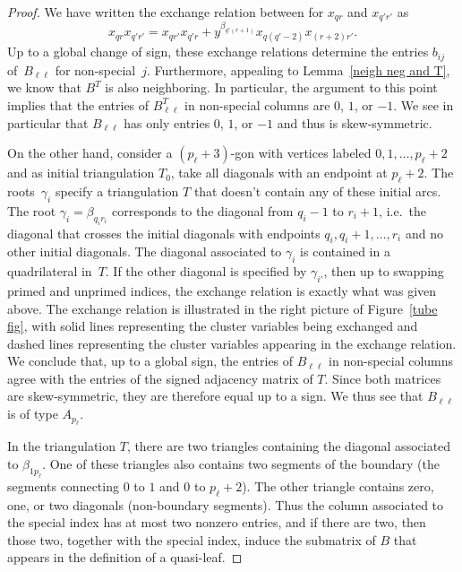 \documentclass{amsart}
\theoremstyle{definition}
\theoremstyle{remark}
\numberwithin{equation}{section}
\newcommand{\0}{{\mathbf{0}}}
\begin{document}
\begin{proof}
We have written the exchange relation between for $x_{qr}$ and $x_{q'r'}$ as 
\begin{equation}\label{exch rel eq}
x_{qr}x_{q'r'}=x_{qr'}x_{q'r}+y^{\beta_{q'(r+1)}}x_{q(q'-2)}x_{(r+2)r'}.
\end{equation}
Up to a global change of sign, these exchange relations determine the entries $b_{ij}$ of~$B_{\ell\ell}$ for non-special~$j$.
Furthermore, appealing to Lemma~\ref{neigh neg and T}, we know that $B^T$ is also neighboring.
In particular, the argument to this point implies that the entries of $B_{\ell\ell}^T$ in non-special columns are $0$, $1$, or $-1$.
We see in particular that $B_{\ell\ell}$ has only entries $0$, $1$, or $-1$ and thus is skew-symmetric. 

On the other hand, consider a $(p_\ell+3)$-gon with vertices labeled $0,1,\ldots,p_\ell+2$ and as initial triangulation $T_0$, take all diagonals with an endpoint at $p_\ell+2$.
The roots~$\gamma_i$ specify a triangulation $T$ that doesn't contain any of these initial arcs.
The root $\gamma_i=\beta_{q_i r_i}$ corresponds to the diagonal from $q_i-1$ to $r_i+1$, i.e.\ the diagonal that crosses the initial diagonals with endpoints $q_i,q_i+1,\ldots,r_i$ and no other initial diagonals.  
The diagonal associated to $\gamma_i$ is contained in a quadrilateral in~$T$.
If the other diagonal is specified by $\gamma_{i'}$, then up to swapping primed and unprimed indices, the exchange relation is exactly what was given above.
The exchange relation is illustrated in the right picture of Figure~\ref{tube fig}, with solid lines representing the cluster variables being exchanged and dashed lines representing the cluster variables appearing in the exchange relation.
We conclude that, up to a global sign, the entries of  $B_{\ell\ell}$ in non-special columns agree with the entries of the signed adjacency matrix of $T$.
Since both matrices are skew-symmetric, they are therefore equal up to a sign.
We thus see that $B_{\ell\ell}$ is of type $A_{p_\ell}$.

In the triangulation $T$, there are two triangles containing the diagonal associated to $\beta_{1 p_\ell}$.
One of these triangles also contains two segments of the boundary (the segments connecting $0$ to $1$ and $0$ to $p_\ell+2$).
The other triangle contains zero, one, or two diagonals (non-boundary segments).
Thus the column associated to the special index has at most two nonzero entries, and if there are two, then those two, together with the special index, induce the submatrix of $B$ that appears in the definition of a quasi-leaf.
\end{proof}
\end{document}
